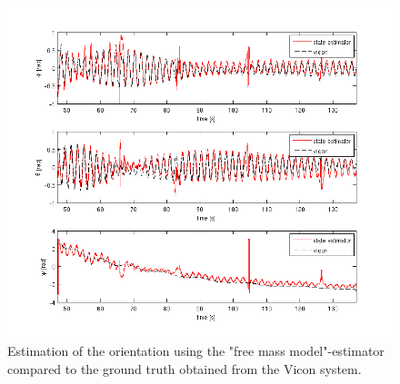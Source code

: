 \begin{figure}[h]
\centering
\includegraphics[width=1\textwidth]{pictures/2_2_fmm_SNR5_orientation_GPS.png}
\caption{Estimation of the orientation using the "free mass model"-estimator compared to the ground truth obtained from the Vicon system.}
\label{orientation_fmm}
\end{figure}

